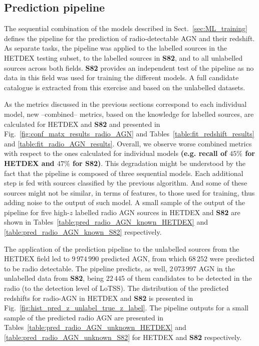 \documentclass{aa}
\begin{document}

\subsection{Prediction pipeline}\label{sec:results_prediction_pipeline}

The sequential combination of the models described in Sect.~\ref{sec:ML_training} defines the pipeline for the prediction of radio-detectable AGN and their redshift. As separate tasks, the pipeline was applied to the labelled sources in the HETDEX testing subset, to the labelled sources in \textbf{S82}, and to all unlabelled sources across both fields. \textbf{S82} provides an independent test of the pipeline as no data in this field was used for training the different models. A full candidate catalogue is extracted from this exercise and based on the unlabelled datasets.

As the metrics discussed in the previous sections correspond to each individual model, new --combined-- metrics, based on the knowledge for labelled sources, are calculated for HETDEX and \textbf{S82} and presented in Fig.~\ref{fig:conf_matx_results_radio_AGN} and Tables~\ref{table:fit_redshift_results} and \ref{table:fit_radio_AGN_results}. Overall, we observe worse combined metrics  with respect to the ones calculated for individual models \textbf{(e.g. recall of $45\%$ for HETDEX and $47\%$ for S82)}. This degradation might be understood by the fact that the pipeline is composed of three sequential models. Each additional step is fed with sources classified by the previous algorithm. And some of these sources might not be similar, in terms of features, to those used for training, thus adding noise to the output of such model. A small sample of the output of the pipeline for five high-$z$ labelled radio AGN sources in HETDEX and \textbf{S82} are shown in Tables~\ref{table:pred_radio_AGN_known_HETDEX} and \ref{table:pred_radio_AGN_known_S82} respectively.

The application of the prediction pipeline to the unlabelled sources from the HETDEX field led to $9\,974\,990$ predicted AGN, from which $68\,252$ were predicted to be radio detectable. The pipeline predicts, as well, $2\,073\,997$ AGN in the unlabelled data from \textbf{S82}, being $22\,445$ of them candidates to be detected in the radio (to the detection level of LoTSS). 
The distribution of the predicted redshifts for radio-AGN in HETDEX and \textbf{S82} is presented in  Fig.~\ref{fig:hist_pred_z_unlabel_true_z_label}. The pipeline outputs for a small sample of the predicted radio AGN are presented in Tables~\ref{table:pred_radio_AGN_unknown_HETDEX} and \ref{table:pred_radio_AGN_unknown_S82} for HETDEX and \textbf{S82} respectively.
\end{document}

